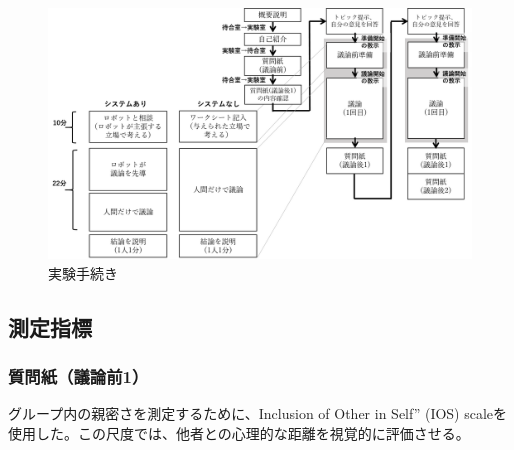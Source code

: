 \documentclass[11pt, a4paper]{jreport} %
\begin{document}
\begin{figure}[htbp]
\begin{center}
\includegraphics[width=150mm]{images/実験手続き.png}
\caption{実験手続き}
\label{fig:進行3}
\end{center}
\end{figure}


\subsection{測定指標}
\subsubsection*{質問紙（議論前1）}
グループ内の親密さを測定するために、Inclusion of Other in Self” (IOS) scaleを使用した。この尺度では、他者との心理的な距離を視覚的に評価させる。
\end{document}
